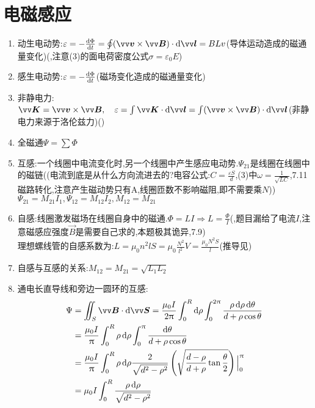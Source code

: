 \documentclass{article}
\begin{document}
\section{电磁感应}
\begin{enumerate}[label=\arabic*.]
  \item 动生电动势:$\varepsilon = -\frac{\dif \Phi}{\dif t} = \oint (\vec{v}\times \vec{B})\cdot\dif\vec{l} = BLv$\quad (导体运动造成的磁通量变化)\quad ({,注意(3)的面电荷密度公式$\sigma = \varepsilon_0 E$})
  \item 感生电动势:$\varepsilon = -\frac{\mathop{}\!\mathrm{d} \Phi}{\mathop{}\!\mathrm{d} t}$\quad (磁场变化造成的磁通量变化)
  \item 非静电力:$\vec{K}=\vec{v}\times \vec{B},\quad \varepsilon = \int \vec{K}\cdot\dif\vec{l} = \int (\vec{v}\times \vec{B})\cdot \dif \vec{l}$\quad (非静电力来源于洛伦兹力)\quad ({})
  \item 全磁通$\Psi = \sum \Phi$
  \item 互感:一个线圈中电流变化时,另一个线圈中产生感应电动势.$\Psi_{21}$是线圈{}在线圈{}中的磁链\quad ({(电流到底是从什么方向流进去的?电容公式:$C=\frac{\varepsilon S}{d}$,(3)中$\omega = \frac{1}{\sqrt{LC}}$,7.11磁路转化,注意产生磁动势只有A,线圈匝数不影响磁阻,即不需要乘$N$)})\\
        $\Psi_{21}=M_{21}I_1,\Psi_{12}=M_{12}I_2,M_{12}=M_{21}$
  \item 自感:线圈激发磁场在线圈自身中的磁通.$\Phi = LI\Rightarrow L=\frac{\Phi}{I}$\quad ({,题目漏给了电流$I$,注意磁感应强度$\vec{B}$是需要自己求的,本题极其诡异,7.9})\\
        理想螺线管的自感系数为:$L=\mu_0 n^2 lS = \mu_0 \frac{N^2}{l^2}V=\frac{\mu_0 N^2 S}{l}$(推导见{})
  \item 自感与互感的关系:$M_{12}=M_{21}=\sqrt{L_1 L_2}$
  \item 通电长直导线和旁边一圆环的互感:
        \[\begin{aligned}
          \Psi &= \iint_S \vec{B}\cdot \dif \vec{S}=\frac{\mu_0 I}{2\uppi}\int_{0}^{R}\dif \rho \int_{0}^{2\uppi}\frac{\rho \dif \rho \dif \theta}{d+\rho \cos \theta}\\
          &= \frac{\mu_0 I}{\uppi}\int_{0}^{R}\rho \dif \rho \int_{0}^{\uppi}\frac{\dif \theta}{d+\rho \cos \theta}\\
          &= \frac{\mu_0 I}{\uppi}\int_{0}^{R}\rho \dif \rho \frac{2}{\sqrt{d^2-\rho ^2}}\left(\sqrt{\frac{d-\rho}{d+\rho}\tan \frac{\theta}{2}}\right)\Big|_{0}^{\uppi}\\
          &= \mu_0 I\int_{0}^{R} \frac{\rho \dif \rho}{\sqrt{d^2-\rho ^2}}\\

\end{aligned}\]
\end{enumerate}
\end{document}
